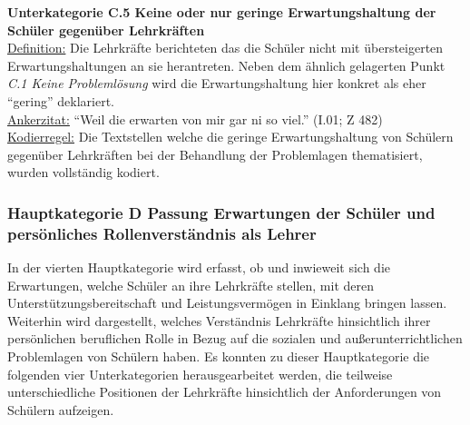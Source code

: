 \noindent
\textbf{Unterkategorie C.5 Keine oder nur geringe Erwartungshaltung der Schüler gegenüber Lehrkräften}\\
\underline{Definition:} Die Lehrkräfte berichteten das die Schüler nicht mit übersteigerten Erwartungshaltungen an sie herantreten. Neben dem ähnlich gelagerten Punkt \textit{C.1 Keine Problemlösung} wird die Erwartungshaltung hier konkret als eher "`gering"' deklariert.\\
\underline{Ankerzitat:} "`Weil die erwarten von mir gar ni so viel."' (I.01; Z 482)\\
\underline{Kodierregel:} Die Textstellen welche die geringe Erwartungshaltung von Schülern gegenüber Lehrkräften bei der Behandlung der Problemlagen thematisiert, wurden vollständig kodiert.

\subsubsection{Hauptkategorie D Passung Erwartungen der Schüler und persönliches Rollenverständnis als Lehrer }
\label{sec:HauptkategorieDPassungErwartungenDerSchülerUndPersönlichesRollenverständnisAlsLehrer}

In der vierten Hauptkategorie wird erfasst, ob und inwieweit sich die Erwartungen, welche Schüler an ihre Lehrkräfte stellen, mit deren Unterstützungsbereitschaft und Leistungsvermögen in Einklang bringen lassen. Weiterhin wird dargestellt, welches Verständnis Lehrkräfte hinsichtlich ihrer persönlichen beruflichen Rolle in Bezug auf die sozialen und außerunterrichtlichen Problemlagen von Schülern haben. Es konnten zu dieser Hauptkategorie die folgenden vier Unterkategorien herausgearbeitet werden, die teilweise unterschiedliche Positionen der Lehrkräfte hinsichtlich der Anforderungen von Schülern aufzeigen.\\

